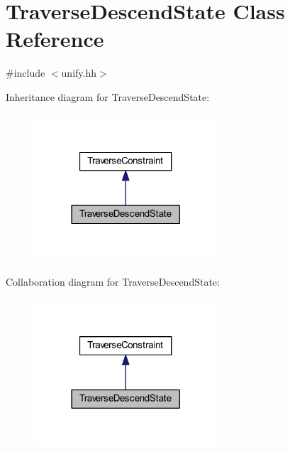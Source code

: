\hypertarget{class_traverse_descend_state}{}\section{Traverse\+Descend\+State Class Reference}
\label{class_traverse_descend_state}


{\ttfamily \#include $<$unify.\+hh$>$}



Inheritance diagram for Traverse\+Descend\+State\+:
\nopagebreak
\begin{figure}[H]
\begin{center}
\leavevmode
\includegraphics[width=194pt]{class_traverse_descend_state__inherit__graph}
\end{center}
\end{figure}


Collaboration diagram for Traverse\+Descend\+State\+:
\nopagebreak
\begin{figure}[H]
\begin{center}
\leavevmode
\includegraphics[width=194pt]{class_traverse_descend_state__coll__graph}
\end{center}
\end{figure}
